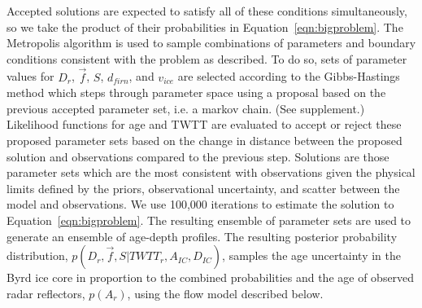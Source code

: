 Accepted solutions are expected to satisfy all of these conditions simultaneously, so we take the product of their probabilities in Equation~\ref{eqn:bigproblem}. The Metropolis algorithm \citep{metropolis} is used to sample combinations of parameters and boundary conditions consistent with the problem as described. To do so, sets of parameter values for $D_r$, $\vec{f}$, $S$, $d_{firn}$, and $v_{ice}$ are selected according to the Gibbs-Hastings method which steps through parameter space using a proposal based on the previous accepted parameter set, i.e. a markov chain.  (See supplement.) %
Likelihood functions for age and TWTT are evaluated to accept or reject these proposed parameter sets based on the change in distance between the proposed solution and observations compared to the previous step. Solutions are those parameter sets which are the most consistent with observations given the physical limits defined by the priors, observational uncertainty, and scatter between the model and observations. We use 100,000 iterations to estimate the solution to Equation~\ref{eqn:bigproblem}. The resulting ensemble of parameter sets are used to generate an ensemble of age-depth profiles. The resulting posterior probability distribution, $p(D_r, \vec{f},S | TWTT_r, A_{IC}, D_{IC})$, samples the age uncertainty in the Byrd ice core in proportion to the combined probabilities and the age of observed radar reflectors, $p(A_r)$, using the flow model described below.



\label{radardepth}

%



